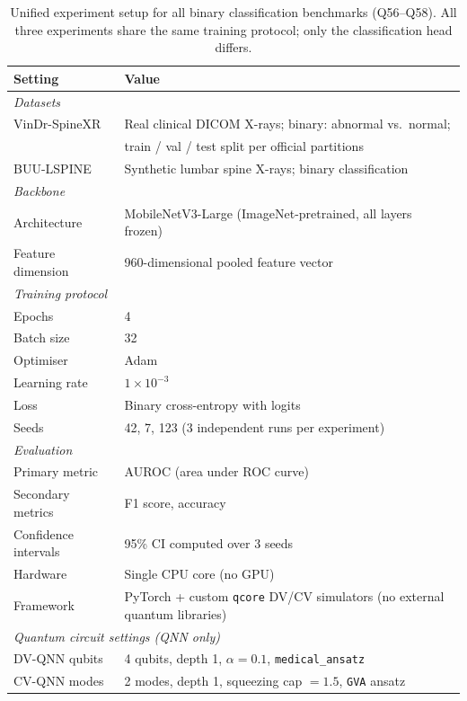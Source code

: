 
\begin{table}[htbp]
\centering
\caption{Unified experiment setup for all binary classification benchmarks (Q56–Q58).
  All three experiments share the same training protocol; only the classification head differs.}
\label{tab:experiment_setup}
\begin{tabular}{lp{8.5cm}}
\toprule
\textbf{Setting} & \textbf{Value} \\
\midrule
\multicolumn{2}{l}{\textit{Datasets}} \\
VinDr-SpineXR          & Real clinical DICOM X-rays; binary: abnormal vs.\ normal; \\
                        & train / val / test split per official partitions \\
BUU-LSPINE             & Synthetic lumbar spine X-rays; binary classification \\
\midrule
\multicolumn{2}{l}{\textit{Backbone}} \\
Architecture            & MobileNetV3-Large (ImageNet-pretrained, all layers frozen) \\
Feature dimension       & 960-dimensional pooled feature vector \\
\midrule
\multicolumn{2}{l}{\textit{Training protocol}} \\
Epochs                  & 4 \\
Batch size              & 32 \\
Optimiser               & Adam \\
Learning rate           & $1 \times 10^{-3}$ \\
Loss                    & Binary cross-entropy with logits \\
Seeds                   & 42, 7, 123 (3 independent runs per experiment) \\
\midrule
\multicolumn{2}{l}{\textit{Evaluation}} \\
Primary metric          & AUROC (area under ROC curve) \\
Secondary metrics       & F1 score, accuracy \\
Confidence intervals    & 95\% CI computed over 3 seeds \\
Hardware                & Single CPU core (no GPU) \\
Framework               & PyTorch + custom \texttt{qcore} DV/CV simulators (no external quantum libraries) \\
\midrule
\multicolumn{2}{l}{\textit{Quantum circuit settings (QNN only)}} \\
DV-QNN qubits           & 4 qubits, depth 1, $\alpha = 0.1$, \texttt{medical\_ansatz} \\
CV-QNN modes            & 2 modes, depth 1, squeezing cap $= 1.5$, \texttt{GVA} ansatz \\
\bottomrule
\end{tabular}
\end{table}
